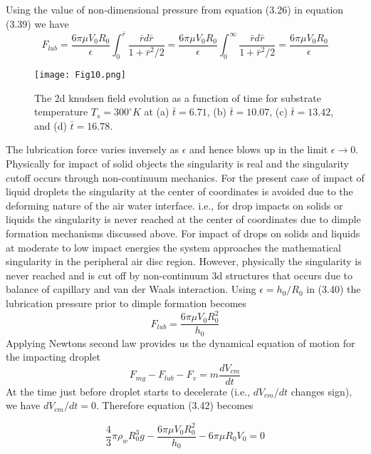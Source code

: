 \documentclass{jfm}
\begin{document}
Using the value of non-dimensional pressure from equation (3.26) in equation (3.39) we have 
\begin{equation}
    F_{lub} = \frac{6{\pi}{\mu}V_0R_0}{\epsilon}\int_0^{\bar{r}}\frac{\bar{r}d\bar{r}}{1+\bar{r}^2/2}=\frac{6{\pi}{\mu}V_0R_0}{\epsilon}\int_0^{\infty}\frac{\bar{r}d\bar{r}}{1+\bar{r}^2/2}=\frac{6{\pi}{\mu}V_0R_0}{\epsilon}
\end{equation}
\begin{figure*}
    \centering
    \texttt{[image: Fig10.png]}
    \caption{
    The 2d knudsen field evolution as a function of time for substrate temperature ${T}_s=300^{\circ}K$ at (a) $\bar{t}=6.71$, (b) $\bar{t}=10.07$, (c) $\bar{t}=13.42$, and (d) $\bar{t}=16.78$.}
    \label{Figure10}
\end{figure*}
The lubrication force varies inversely as ${\epsilon}$ and hence blows up in the limit ${\epsilon}{\rightarrow}0$. Physically for impact of solid objects the singularity is real and the singularity cutoff occurs through non-continuum mechanics. For the present case of impact of liquid droplets the singularity at the center of coordinates is avoided  due to the deforming nature of the air water interface. i.e., for drop impacts on solids or liquids the singularity is never reached at the center of coordinates due to dimple formation mechanisms discussed above.
For impact of drops on solids and liquids at moderate to low impact energies the system approaches the mathematical singularity in the peripheral air disc region. However, physically the singularity is never reached and is cut off by non-continuum 3d structures that occurs due to balance of capillary and van der Waals interaction.
Using ${\epsilon}=h_0/R_0$ in (3.40) the lubrication pressure prior to dimple formation becomes
\begin{equation}
    F_{lub}=\frac{6{\pi}{\mu}V_0R_0^2}{h_0}
\end{equation}
Applying Newtons second law provides us the dynamical equation of motion for the impacting droplet
\begin{equation}
    F_{mg} - F_{lub} - F_v= m\frac{dV_{cm}}{dt}
\end{equation}
At the time just before droplet starts to decelerate (i.e., $dV_{cm}/dt$ changes sign), we have $dV_{cm}/dt=0$. Therefore equation (3.42) becomes

\begin{equation}
    \frac{4}{3}{\pi}{\rho}_wR_0^3g - \frac{6{\pi}{\mu}V_0R_0^2}{h_0} -  6{\pi}{\mu}R_0V_0 = 0
\end{equation}
\end{document}
